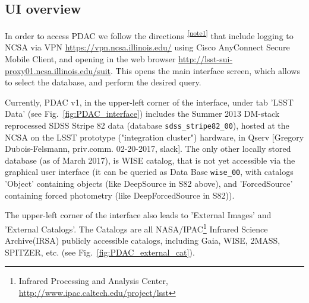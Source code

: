 \documentclass[DM,lsstdraft,toc]{lsstdoc}
\begin{document}
\subsection{UI overview}

In order to access PDAC we 	follow the directions\textsuperscript{~\ref{note1}} that include logging to NCSA via VPN \url{https://vpn.ncsa.illinois.edu/} using Cisco AnyConnect Secure Mobile Client, and opening in the web browser \url{http://lsst-sui-proxy01.ncsa.illinois.edu/suit}. This opens the main interface screen, which allows to select the database, and perform the desired query.

Currently, PDAC v1,  in the upper-left corner of the interface, under tab 'LSST Data' (see Fig.~\ref{fig:PDAC_interface}) includes the Summer 2013 DM-stack reprocessed SDSS Stripe 82 data (database \verb|sdss_stripe82_00|), hosted at the NCSA on the LSST prototype ("integration cluster") hardware, in Qserv [Gregory Dubois-Felsmann, priv.comm. 02-20-2017, slack].  The only other locally stored database (as of March 2017), is  WISE catalog, that is not yet accessible via the graphical user interface (it can be queried as Data Base \verb|wise_00|, with catalogs 'Object' containing objects (like DeepSource in S82 above), and 'ForcedSource' containing forced photometry (like DeepForcedSource in S82)).


The upper-left corner of the interface also leads to 'External Images' and 'External Catalogs'. The Catalogs are all NASA/IPAC\footnote{Infrared Processing and Analysis Center, \url{http://www.ipac.caltech.edu/project/lsst}}  Infrared Science Archive(IRSA) publicly accessible catalogs, including Gaia, WISE, 2MASS, SPITZER, etc. (see Fig.~\ref{fig:PDAC_external_cat}).
\end{document}
